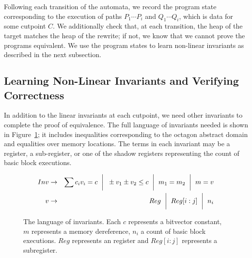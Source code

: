 Following each transition of the automata, we record the program state
corresponding to the execution of paths $P_1\dotsm P_i$ and $Q_1
\dotsm Q_i$, which is data for some cutpoint $C$. We additionally
check that, at each transition, the heap of the target matches the
heap of the rewrite; if not, we know that we cannot prove the programs
equivalent. We use the program states to learn non-linear invariants
as described in the next subsection.

\subsection{Learning Non-Linear Invariants and Verifying Correctness} \label{algstep6}

In addition to the linear invariants at each cutpoint, we need other
invariants to complete the proof of equivalence. The full language
of invariants needed is shown in Figure~\ref{fig:invlang}; it includes
inequalities corresponding to the octagon abstract domain
and equalities over memory locations. The terms in each invariant
may be a register, a sub-register, or one of the shadow registers
representing the count of basic block executions.  

\begin{figure}
\begin{eqnarray*}
Inv &\rightarrow& \sum c_iv_i = c \hspace{2mm}\bigg|\hspace{2mm} \pm v_1 \pm v_2 \leq c \hspace{2mm}\bigg|\hspace{2mm} m_1 = m_2 \hspace{2mm}\bigg|\hspace{2mm} m = v\\
v   &\rightarrow& Reg \hspace{2mm}\bigg|\hspace{2mm}  Reg[i:j]  \hspace{2mm}\bigg|\hspace{2mm} n_i\\
\end{eqnarray*}
\caption{The language of invariants.  Each $c$ represents a bitvector constant, $m$ represents a memory dereference, $n_i$ a count of basic block executions.  $Reg$ represents an \arch{} register and $Reg[i:j]$ represents a subregister.}
\label{fig:invlang}
\end{figure}

